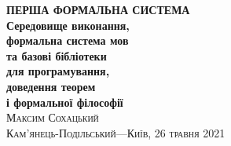 \frontmatter
\thispagestyle{empty}
\mbox{}\vspace{1in}
\noindent
\begin{flushright}
\vspace{0.5cm}
\textbf{\Huge ПЕРША ФОРМАЛЬНА СИСТЕМА} \\
\vspace{0.5cm}
\textbf{\huge Середовище виконання, \\
        \huge формальна система мов \\
        \huge та базові бібліотеки \\
        \huge для програмування, \\
        \huge доведення теорем \\
        \huge і формальної філософії \\
}
\vspace{1em}
\vspace{6cm}
\hfill{\Large\scshape{}Максим Сохацький}
\\
\vspace{0.3cm}
\hfill{\scshape{}Кам'янець-Подільський---Київ, 26 травня 2021}
\end{flushright}
\cleartorecto
\tableofcontents*
\mainmatter
